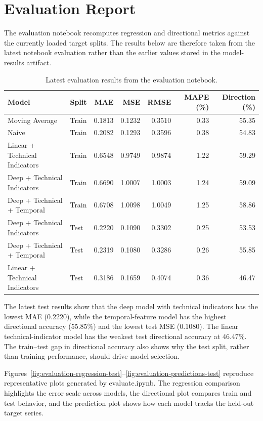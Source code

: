 \section{Evaluation Report}

The evaluation notebook recomputes regression and directional metrics against the currently loaded target splits. The results below are therefore taken from the latest notebook evaluation rather than the earlier values stored in the model-results artifact.

\begin{table}[h!]
\centering
\caption{Latest evaluation results from the evaluation notebook.}
\label{tab:toy-results}
\scriptsize
\setlength{\tabcolsep}{4pt}
\begin{tabular}{llrrrrr}
\toprule
\textbf{Model} & \textbf{Split} & \textbf{MAE} & \textbf{MSE} & \textbf{RMSE} & \textbf{MAPE (\%)} & \textbf{Direction (\%)} \\
\midrule
Moving Average & Train & 0.1813 & 0.1232 & 0.3510 & 0.33 & 55.35 \\
Naive & Train & 0.2082 & 0.1293 & 0.3596 & 0.38 & 54.83 \\
Linear + Technical Indicators & Train & 0.6548 & 0.9749 & 0.9874 & 1.22 & 59.29 \\
Deep + Technical Indicators & Train & 0.6690 & 1.0007 & 1.0003 & 1.24 & 59.09 \\
Deep + Technical + Temporal & Train & 0.6708 & 1.0098 & 1.0049 & 1.25 & 58.86 \\
Deep + Technical Indicators & Test & 0.2220 & 0.1090 & 0.3302 & 0.25 & 53.53 \\
Deep + Technical + Temporal & Test & 0.2319 & 0.1080 & 0.3286 & 0.26 & 55.85 \\
Linear + Technical Indicators & Test & 0.3186 & 0.1659 & 0.4074 & 0.36 & 46.47 \\
\bottomrule
\end{tabular}
\end{table}

The latest test results show that the deep model with technical indicators has the lowest MAE (0.2220), while the temporal-feature model has the highest directional accuracy (55.85\%) and the lowest test MSE (0.1080). The linear technical-indicator model has the weakest test directional accuracy at 46.47\%. The train--test gap in directional accuracy also shows why the test split, rather than training performance, should drive model selection.

Figures~\ref{fig:evaluation-regression-test}--\ref{fig:evaluation-predictions-test} reproduce representative plots generated by evaluate.ipynb. The regression comparison highlights the error scale across models, the directional plot compares train and test behavior, and the prediction plot shows how each model tracks the held-out target series.

